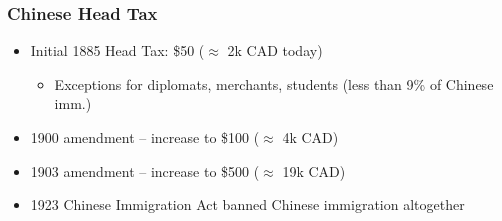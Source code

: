 \documentclass[xcolor=dvipsnames, compress, 12pt, aspectratio=169, handout]{beamer}
\begin{document}
\begin{frame}
    \frametitle{Chinese Head Tax}
    \label{headtaxinfo}
    \begin{itemize}
        \item Initial 1885 Head Tax: \$50 ($\approx$ 2k CAD today)
        \begin{itemize}
            \vspace{1mm}
            \item Exceptions for diplomats, merchants, students (less than 9\% of Chinese imm.)
        \end{itemize}
        \vspace{2mm}
        \item 1900 amendment -- increase to \$100 ($\approx$ 4k CAD) \vspace{2mm}
        \item 1903 amendment -- increase to \$500 ($\approx$ 19k CAD) \vspace{2mm}
        \item 1923 Chinese Immigration Act banned Chinese immigration altogether
    \end{itemize}
    \vspace{2mm}
    \hyperlink{fig_headtax}{} \hyperlink{figa1_tax}{}
\end{frame}

\end{document}

